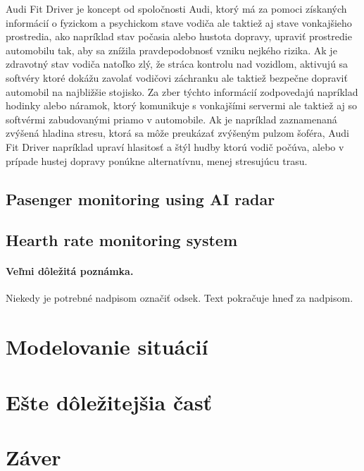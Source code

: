 \documentclass[10pt,twoside,slovak,a4paper]{article}
\begin{document}
Audi Fit Driver je koncept od spoločnosti Audi, ktorý má za pomoci získaných informácií o fyzickom a psychickom stave vodiča ale taktiež aj stave vonkajšieho prostredia, ako napríklad stav počasia alebo hustota dopravy, upraviť prostredie automobilu tak, aby sa znížila pravdepodobnosť vzniku nejkého rizika. Ak je zdravotný stav vodiča natoľko zlý, že stráca kontrolu nad vozidlom, aktivujú sa softvéry ktoré dokážu zavolať vodičovi záchranku ale taktiež bezpečne dopraviť automobil na najbližšie stojisko. Za zber týchto informácií zodpovedajú napríklad hodinky alebo náramok, ktorý komunikuje s vonkajšími servermi ale taktiež aj so softvérmi zabudovanými priamo v automobile. Ak je napríklad zaznamenaná zvýšená hladina stresu, ktorá sa môže preukázať zvýšeným pulzom šoféra, Audi Fit Driver napríklad upraví hlasitosť a štýl hudby ktorú vodič počúva, alebo v prípade hustej dopravy ponúkne alternatívnu, menej stresujúcu trasu.


\subsection{Pasenger monitoring using AI radar} \label{predstavenie:radar}

\subsection{Hearth rate monitoring system} \label{predstavenie:hearth}

\paragraph{Veľmi dôležitá poznámka.}
Niekedy je potrebné nadpisom označiť odsek. Text pokračuje hneď za nadpisom.



\section{Modelovanie situácií} \label{modelovanie}




\section{Ešte dôležitejšia časť} \label{dolezitejsia}




\section{Záver} \label{zaver} %







\end{document}
